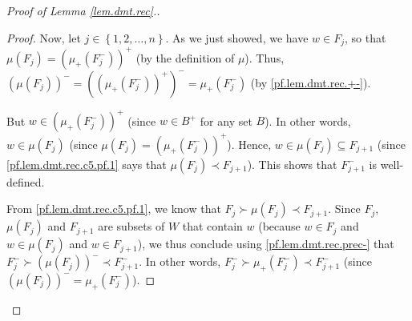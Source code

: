 \documentclass[12pt]{amsart}
\theoremstyle{definition}
\begin{document}
\begin{proof}[Proof of Lemma \ref{lem.dmt.rec}.]
\begin{proof}
Now, let $j\in\left\{  1,2,\ldots,n\right\}  $. As we just showed, we have
$w\in F_{j}$, so that $\mu\left(  F_{j}\right)  =\left(  \mu_+\left(
F_{j}^-\right)  \right)  ^+$ (by the definition of $\mu$). Thus, $\left(
\mu\left(  F_{j}\right)  \right)  ^-=\left(  \left(  \mu_+\left(
F_{j}^-\right)  \right)  ^+\right)  ^-=\mu_+\left(  F_{j}^-\right)
$ (by \eqref{pf.lem.dmt.rec.+-}).

But $w\in\left(  \mu_+\left(  F_{j}^-\right)  \right)  ^+$ (since $w\in
B^+$ for any set $B$). In other words, $w\in\mu\left(  F_{j}\right)  $
(since $\mu\left(  F_{j}\right)  =\left(  \mu_+\left(  F_{j}^-\right)
\right)  ^+$). Hence, $w\in\mu\left(  F_{j}\right)  \subseteq F_{j+1}$
(since \eqref{pf.lem.dmt.rec.c5.pf.1} says that $\mu\left(  F_{j}\right)
\prec F_{j+1}$). This shows that $F_{j+1}^-$ is well-defined.

From \eqref{pf.lem.dmt.rec.c5.pf.1}, we know that $F_{j}\succ\mu\left(
F_{j}\right)  \prec F_{j+1}$. Since $F_{j}$, $\mu\left(  F_{j}\right)  $ and
$F_{j+1}$ are subsets of $W$ that contain $w$ (because $w\in F_{j}$ and
$w\in\mu\left(  F_{j}\right)  $ and $w\in F_{j+1}$), we thus conclude using
\eqref{pf.lem.dmt.rec.prec-} that $F_{j}^-\succ\left(  \mu\left(
F_{j}\right)  \right)  ^-\prec F_{j+1}^-$. In other words, $F_{j}^-%
\succ\mu_+\left(  F_{j}^-\right)  \prec F_{j+1}^-$ (since $\left(
\mu\left(  F_{j}\right)  \right)  ^-=\mu_+\left(  F_{j}^-\right)  $).


\end{proof}
\end{proof}
\end{document}
